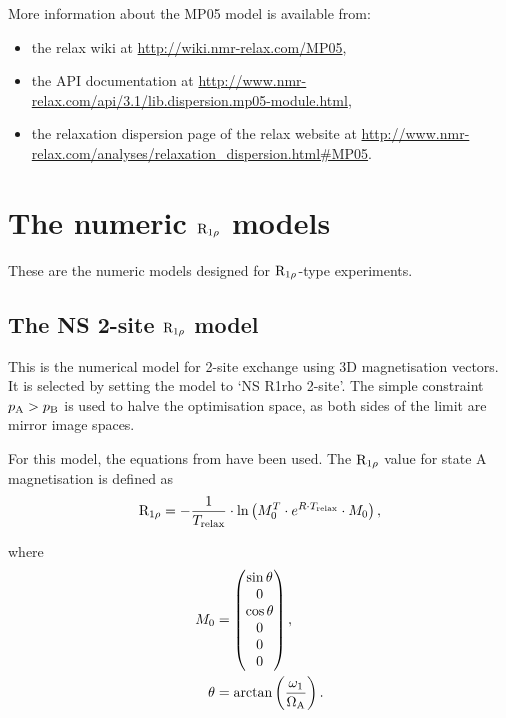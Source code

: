 More information about the MP05 model is available from:
\begin{itemize}
  \item the relax wiki at \url{http://wiki.nmr-relax.com/MP05},
  \item the API documentation at \url{http://www.nmr-relax.com/api/3.1/lib.dispersion.mp05-module.html},
  \item the relaxation dispersion page of the relax website at \url{http://www.nmr-relax.com/analyses/relaxation\_dispersion.html#MP05}.
\end{itemize}




\section{The numeric $\mathrm{R}_{1\rho}$ models}
\label{sect: dispersion: numeric R1rho models}

These are the numeric models designed for $\mathrm{R}_{1\rho}$-type experiments.



\subsection{The NS 2-site $\mathrm{R}_{1\rho}$ model}
\label{sect: dispersion: NS R1rho 2-site model}

This is the numerical model for 2-site exchange using 3D magnetisation vectors.
It is selected by setting the model to `NS R1rho 2-site'.
The simple constraint $p_\textrm{A} > p_\textrm{B}$ is used to halve the optimisation space, as both sides of the limit are mirror image spaces.

For this model, the equations from \citet{Korzhnev05a} have been used.
The $\mathrm{R}_{1\rho}$ value for state A magnetisation is defined as
\begin{equation}
    \mathrm{R}_{1\rho} = - \frac{1}{T_\textrm{relax}}  \cdot \ln \left( M_0^T \cdot e^{R \cdot T_\textrm{relax}} \cdot M_0 \right),
\end{equation}

where
\begin{align}
    M_0    &= \begin{pmatrix} \sin{\theta} \\ 0 \\ \cos{\theta} \\ 0 \\ 0 \\ 0  \end{pmatrix}, \\
    \theta &= \arctan \left( \frac{\omega_1}{\Omega_\textrm{A}} \right).
\end{align}

